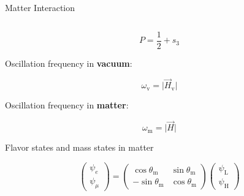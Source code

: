 \begin{frame}{Matter Interaction}
\begin{columns}[T]
\begin{column}{0.5\textwidth}
\begin{equation*}
P = \frac{1}{2} + s_3
\end{equation*}

Oscillation frequency in {\bf vacuum}:

\begin{equation*}
    \omega_{\mathrm v} = \lvert \vec H_{\mathrm v} \rvert
\end{equation*}


Oscillation frequency in {\bf matter}:

\begin{equation*}
    \omega_{\mathrm m} = \lvert \vec H \rvert
\end{equation*}

Flavor states and mass states in matter

\begin{equation*}
\begin{pmatrix}
\psi_e\\
\psi_\mu
\end{pmatrix} = \begin{pmatrix}
\cos \theta_{\mathrm m} & \sin\theta_{\mathrm m} \\
-\sin \theta_{\mathrm m} & \cos \theta_{\mathrm m}
\end{pmatrix}\begin{pmatrix}
\psi_{\mathrm L}\\
\psi_{\mathrm H}
\end{pmatrix}
\end{equation*}


\end{column}
\end{columns}

\end{frame}






